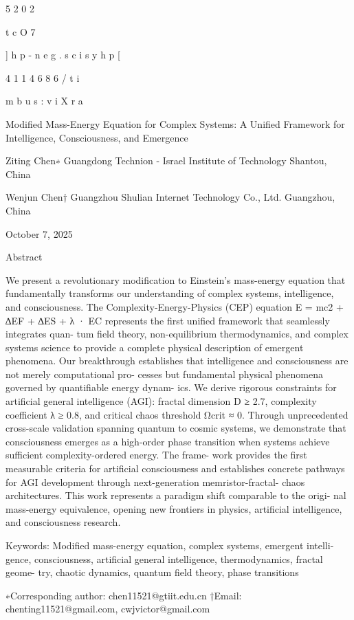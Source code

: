 5
2
0
2

t
c
O
7

]
h
p
-
n
e
g
.
s
c
i
s
y
h
p
[

4
1
1
4
6
8
6
/
t
i

m
b
u
s
:
v
i
X
r
a

Modified Mass-Energy Equation for Complex
Systems:
A Unified Framework for Intelligence, Consciousness,
and Emergence

Ziting Chen∗
Guangdong Technion - Israel Institute of Technology
Shantou, China

Wenjun Chen†
Guangzhou Shulian Internet Technology Co., Ltd.
Guangzhou, China

October 7, 2025

Abstract

We present a revolutionary modification to Einstein’s mass-energy equation that
fundamentally transforms our understanding of complex systems, intelligence, and
consciousness. The Complexity-Energy-Physics (CEP) equation E = mc2 + ∆EF +
∆ES + λ · EC represents the first unified framework that seamlessly integrates quan-
tum field theory, non-equilibrium thermodynamics, and complex systems science to
provide a complete physical description of emergent phenomena. Our breakthrough
establishes that intelligence and consciousness are not merely computational pro-
cesses but fundamental physical phenomena governed by quantifiable energy dynam-
ics. We derive rigorous constraints for artificial general intelligence (AGI): fractal
dimension D ≥ 2.7, complexity coefficient λ ≥ 0.8, and critical chaos threshold
Ωcrit ≈ 0. Through unprecedented cross-scale validation spanning quantum to
cosmic systems, we demonstrate that consciousness emerges as a high-order phase
transition when systems achieve sufficient complexity-ordered energy. The frame-
work provides the first measurable criteria for artificial consciousness and establishes
concrete pathways for AGI development through next-generation memristor-fractal-
chaos architectures. This work represents a paradigm shift comparable to the origi-
nal mass-energy equivalence, opening new frontiers in physics, artificial intelligence,
and consciousness research.

Keywords: Modified mass-energy equation, complex systems, emergent intelli-
gence, consciousness, artificial general intelligence, thermodynamics, fractal geome-
try, chaotic dynamics, quantum field theory, phase transitions

∗Corresponding author: chen11521@gtiit.edu.cn
†Email: chenting11521@gmail.com, cwjvictor@gmail.com

